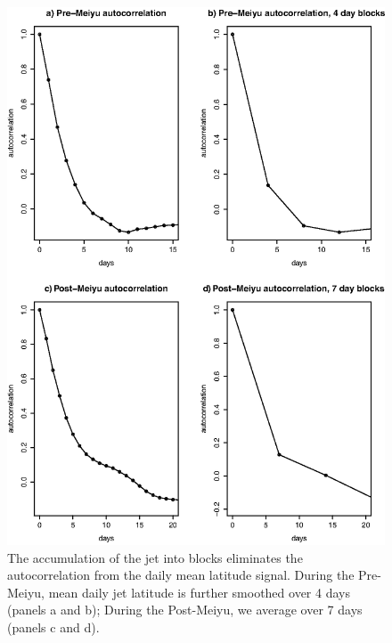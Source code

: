 \begin{figure}[htbp]
\centering
\includegraphics[width=42pc]{Figures/ch4/jet_autocorr}
\caption{The accumulation of the jet into blocks eliminates the autocorrelation from the daily mean latitude signal. During the Pre-Meiyu, mean daily jet latitude is further smoothed over 4 days (panels a and b); During the Post-Meiyu, we average over 7 days (panels c and d).}
\label{fig:jet_autocorr}
\end{figure}
